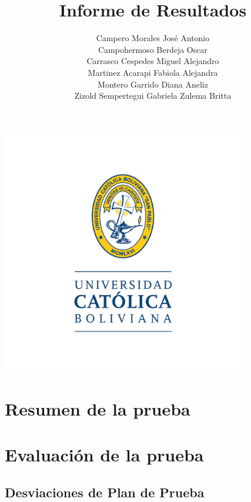 \documentclass[stu, 12pt, letterpaper, donotrepeattitle, floatsintext, natbib]{apa7}
\title{\Large Informe de Resultados }
\author{
    Campero Morales José Antonio \\
    Campohermoso Berdeja Oscar \\
    Carrasco Cespedes Miguel Alejandro \\
    Martinez Acarapi Fabiola Alejandra \\
    Montero Garrido Diana Aneliz \\
    Zizold Sempertegui Gabriela Zulema Britta
}
\affiliation{Universidad Católica Boliviana}
\begin{document}
\thispagestyle{empty}

\centering
\includegraphics[width=0.8\textwidth]{../imgs/logo-ucb.png} %
\vspace{-5cm} %

\maketitle

\newpage
{}
\renewcommand\contentsname{\large Índice}
\tableofcontents
\setcounter{tocdepth}{2}
\newpage
\renewcommand{\listfigurename}{\large Índice de figuras}
\listoffigures
\newpage
\renewcommand{\listtablename}{\large Índice de tablas}
\listoftables
\newpage

\newpage

\section{\large Resumen de la prueba}

\section{\large Evaluación de la prueba}

\subsection{Desviaciones de Plan de Prueba}
\end{document}

